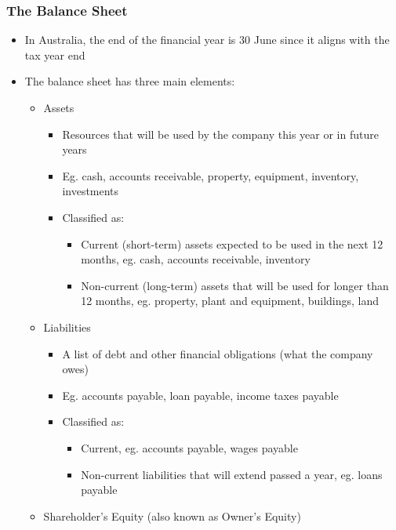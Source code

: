 \documentclass{article}
\begin{document}
		\subsubsection{The Balance Sheet}
			\begin{itemize}
				\item In Australia, the end of the financial year is 30 June since it aligns with the tax year end
				\item The balance sheet has three main elements:
					\begin{itemize}
						\item Assets
							\begin{itemize}
								\item Resources that will be used by the company this year or in future years
								\item Eg. cash, accounts receivable, property, equipment, inventory, investments
								\item Classified as:
									\begin{itemize}
										\item \colorbox{pastel_green}{Current} (short-term) assets expected to be used in the next 12 months, eg. cash, accounts receivable, inventory
										\item \colorbox{pastel_green}{Non-current} (long-term) assets that will be used for longer than 12 months, eg. property, plant and equipment, buildings, land
									\end{itemize}
							\end{itemize}
						\item Liabilities
							\begin{itemize}
								\item A list of debt and other financial obligations (what the company owes)
								\item Eg. accounts payable, loan payable, income taxes payable
								\item Classified as:
									\begin{itemize}
										\item \colorbox{pastel_green}{Current,} eg. accounts payable, wages payable
										\item \colorbox{pastel_green}{Non-current} liabilities that will extend passed a year, eg. loans payable
									\end{itemize}
							\end{itemize}
						\item Shareholder's Equity (also known as Owner's Equity)
							\begin{itemize}

\end{itemize}
\end{itemize}
\end{itemize}
\end{document}
